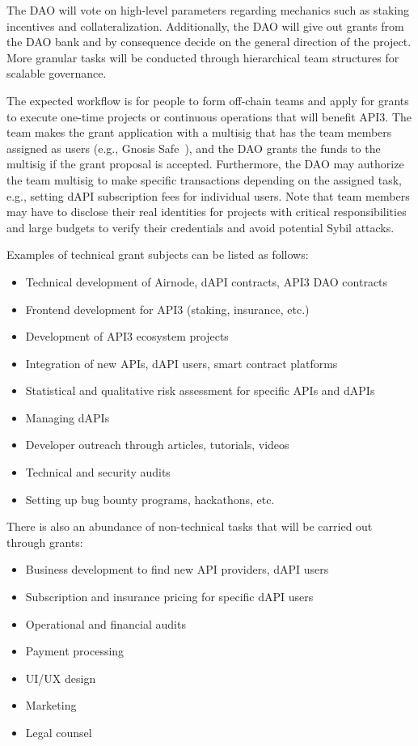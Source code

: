 \documentclass[11pt]{article}
\begin{document}
The DAO will vote on high-level parameters regarding mechanics such as staking incentives and collateralization.
Additionally, the DAO will give out grants from the DAO bank and by consequence decide on the general direction of the project.
More granular tasks will be conducted through hierarchical team structures for scalable governance.

The expected workflow is for people to form off-chain teams and apply for grants to execute one-time projects or continuous operations that will benefit API3.
The team makes the grant application with a multisig that has the team members assigned as users (e.g., Gnosis Safe~\cite{gnosis}), and the DAO grants the funds to the multisig if the grant proposal is accepted.
Furthermore, the DAO may authorize the team multisig to make specific transactions depending on the assigned task, e.g., setting dAPI subscription fees for individual users.
Note that team members may have to disclose their real identities for projects with critical responsibilities and large budgets to verify their credentials and avoid potential Sybil attacks.

Examples of technical grant subjects can be listed as follows:
\begin{itemize}
    \item Technical development of Airnode, dAPI contracts, API3 DAO contracts
    \item Frontend development for API3 (staking, insurance, etc.)
    \item Development of API3 ecosystem projects
    \item Integration of new APIs, dAPI users, smart contract platforms
    \item Statistical and qualitative risk assessment for specific APIs and dAPIs
    \item Managing dAPIs
    \item Developer outreach through articles, tutorials, videos
    \item Technical and security audits
    \item Setting up bug bounty programs, hackathons, etc.
\end{itemize}

There is also an abundance of non-technical tasks that will be carried out through grants:
\begin{itemize}
    \item Business development to find new API providers, dAPI users
    \item Subscription and insurance pricing for specific dAPI users
    \item Operational and financial audits
    \item Payment processing
    \item UI/UX design
    \item Marketing
    \item Legal counsel
\end{itemize}
\end{document}
